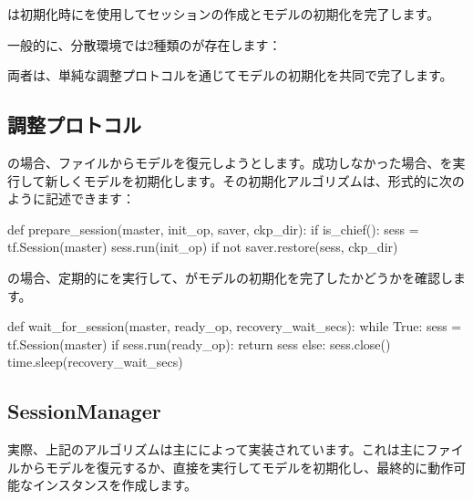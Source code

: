 \begin{content}

は初期化時にを使用してセッションの作成とモデルの初期化を完了します。

一般的に、分散環境では2種類のが存在します：

\begin{enum}
\end{enum}

両者は、単純な調整プロトコルを通じてモデルの初期化を共同で完了します。

\subsection{調整プロトコル}

の場合、ファイルからモデルを復元しようとします。成功しなかった場合、を実行して新しくモデルを初期化します。その初期化アルゴリズムは、形式的に次のように記述できます：

\begin{leftbar}
\begin{python}
def prepare_session(master, init_op, saver, ckp_dir):
  if is_chief():
    sess = tf.Session(master)
    sess.run(init_op) if not saver.restore(sess, ckp_dir)
\end{python}
\end{leftbar}

の場合、定期的にを実行して、がモデルの初期化を完了したかどうかを確認します。

\begin{leftbar}
\begin{python}
def wait_for_session(master, ready_op, recovery_wait_secs):
  while True:
    sess = tf.Session(master)
    if sess.run(ready_op):
      return sess
    else:
      sess.close()
      time.sleep(recovery_wait_secs)   
\end{python}
\end{leftbar}

\subsection{SessionManager}

実際、上記のアルゴリズムは主にによって実装されています。これは主にファイルからモデルを復元するか、直接を実行してモデルを初期化し、最終的に動作可能なインスタンスを作成します。


\end{content}
